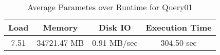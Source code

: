 \documentclass[../../main.tex]{subfiles}
\begin{document}
    \begin{table}
        \begin{center}
            \begin{tabular}{ |c|c|c|c| } 
            \hline
            Load & Memory & Disk IO & Execution Time\\
            \hline
            7.51 & 34721.47 MB & 0.91 MB/sec & 304.50 sec \\
            \hline
            \end{tabular}
            \\[1pt]
            \caption{Average Parametes over Runtime for Query01}
        \end{center}
    \end{table}
    \pagebreak
\end{document}
